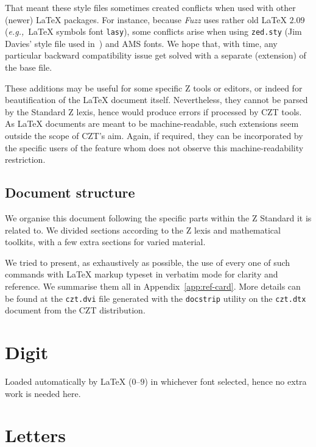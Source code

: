 \documentclass{article}
\newcommand{\emfile}[1]{\texttt{#1}}%
\begin{document}
That meant these style files sometimes created conflicts when used with other (newer) \LaTeX{} packages.
For instance, because \textit{Fuzz} uses rather old \LaTeX{} $2.09$ (\textit{e.g.,}~\LaTeX{} symbols
font \texttt{lasy}), some conflicts arise when using \emfile{zed.sty} (Jim Davies' style file
used in~\cite{usingz}) and AMS fonts. We hope that, with time, any particular backward compatibility
issue get solved with a separate (extension) of the base \cztstylefile{} file.

These additions may be useful for some specific Z tools or editors, or indeed for
beautification of the \LaTeX{} document itself. Nevertheless, they cannot be parsed
by the Standard Z lexis, hence would produce errors if processed by CZT tools. As
\LaTeX{} documents are meant to be machine-readable, such extensions seem outside
the scope of CZT's aim. Again, if required, they can be incorporated by the specific
users of the feature whom does not observe this machine-readability restriction.

\subsection{Document structure}\label{sec:intro-struct}

We organise this document following the specific parts within the Z Standard it is related to.
We divided sections according to the Z lexis and mathematical toolkits, with a few extra
sections for varied material.

We tried to present, as exhaustively as possible, the use of every one
of such commands with \LaTeX{} markup typeset in verbatim mode for
clarity and reference. We summarise them all in Appendix~\ref{app:ref-card}.
More details can be found at the \texttt{czt.dvi} file generated with
the \texttt{docstrip} utility on the \texttt{czt.dtx} document from
the CZT distribution.

\section{Digit}\label{sec:digit}

Loaded automatically by \LaTeX{} ($0$--$9$) in whichever font selected, hence
no extra work is needed here.

\section{Letters}\label{sec:letters}
\end{document}
